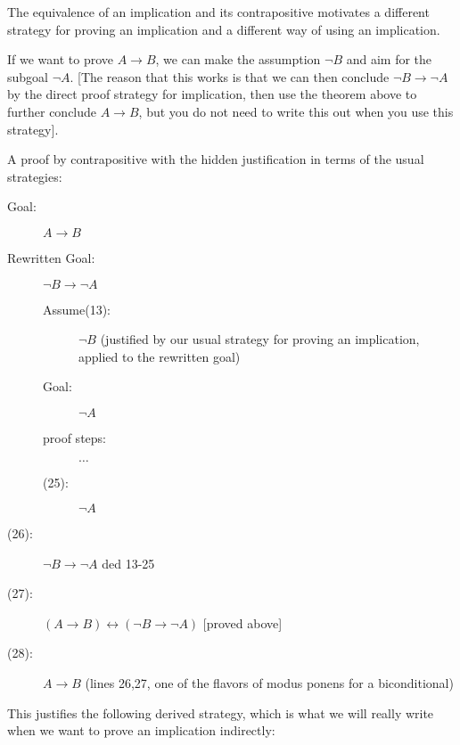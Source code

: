 \documentclass[12pt]{article}
\begin{document}
The equivalence of an implication and its contrapositive motivates a different strategy for proving an implication and a different way of using an implication.

If we want to prove $A \rightarrow B$, we can make the assumption $\neg B$
and aim for the subgoal $\neg A$.  [The reason that this works is that we
can then conclude $\neg B \rightarrow \neg A$ by the direct proof strategy for implication, then use the theorem above to further conclude $A \rightarrow B$, but you do not need to write this out when you use this strategy].

A proof by contrapositive with the hidden justification in terms of the usual strategies:

\begin{description}

\item[Goal:]  $A \rightarrow B$

\item[Rewritten Goal:]  $\neg B \rightarrow \neg A$

\begin{description}

\item[Assume(13):]  $\neg B$ (justified by our usual strategy for proving an implication, applied to the rewritten goal)

\item[Goal:]  $\neg A$

\item[proof steps:]  $\ldots$

\item[(25):]  $\neg A$

\end{description}

\item[(26):]  $\neg B \rightarrow \neg A$ ded 13-25

\item[(27):]  $(A \rightarrow B) \leftrightarrow (\neg B \rightarrow \neg A)$ [proved above]

\item[(28):]  $A \rightarrow B$  (lines 26,27, one of the flavors of modus ponens for a biconditional)
\end{description}

\newpage

This justifies the following derived strategy, which is what we will really write when we want to prove an implication indirectly:

\end{document}
